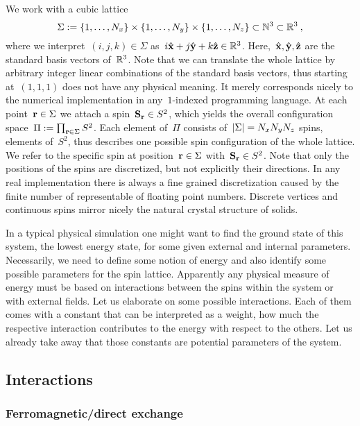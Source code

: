 
We work with a cubic lattice
%
\begin{equation}
  \Sigma := \{1,\dots,N_x\} \times \{1,\dots,N_y\} \times
  \{1,\dots,N_z\} \subset \mathbb{N}^3 \subset \mathbb{R}^3\:,
\end{equation}
%
where we interpret~$(i,j,k) \in \Sigma$ as~$i \hat{\mathbf{x}} + j \hat{\mathbf{y}} + k \hat{\mathbf{z}}
\in \mathbb{R}^3$. Here,~$\hat{\mathbf{x}}, \hat{\mathbf{y}}, \hat{\mathbf{z}}$ are the standard basis vectors of~$\mathbb{R}^3$.
Note that we can translate the whole lattice by arbitrary integer linear
combinations of the standard basis vectors, thus starting at~$(1,1,1)$ does not
have any physical meaning. It merely corresponds nicely to the numerical
implementation in any~$1$-indexed programming language. At each point~$\mathbf{r} \in
\Sigma$ we attach a spin~$\mathbf{S}_{\mathbf{r}} \in S^2$, which yields the overall
configuration space~$\Pi := \prod_{\mathbf{r} \in \Sigma} S^2$. Each element of~$\Pi$
consists of~$\abs{\Sigma}=N_x N_y N_z$ spins, \ie{} elements of~$S^2$, thus
describes one possible spin configuration of the whole lattice. We refer to the
specific spin at position~$\mathbf{r} \in \Sigma$ with~$\mathbf{S}_{\mathbf{r}} \in S^2$. Note that
only the positions of the spins are discretized, but not explicitly their
directions. In any real implementation there is always a fine grained
discretization caused by the finite number of representable of floating point
numbers. Discrete vertices and continuous spins mirror nicely the natural
crystal structure of solids.

In a typical physical simulation one might want to find the ground state of this
system, \ie{} the lowest energy state, for some given external and internal
parameters. Necessarily, we need to define some notion of energy and also
identify some possible parameters for the spin lattice. Apparently any physical
measure of energy must be based on interactions between the spins within the
system or with external fields. Let us elaborate on some possible interactions.
Each of them comes with a constant that can be interpreted as a weight, \ie{}
how much the respective interaction contributes to the energy with respect to
the others. Let us already take away that those constants are potential
parameters of the system.

\subsection{Interactions}

\subsubsection{Ferromagnetic/direct exchange}

